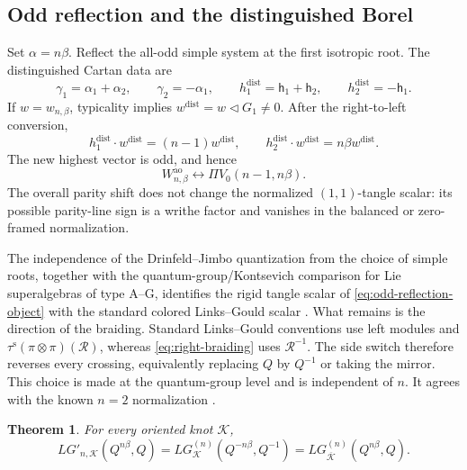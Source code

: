 \documentclass[11pt,a4paper]{article}
\newcommand{\ot}{\otimes}
\newcommand{\tri}{\mathbin{\triangleleft}}
\newcommand{\ao}{\mathrm{ao}}
\newtheorem{theorem}{Theorem}[section]
\theoremstyle{definition}
\theoremstyle{remark}
\begin{document}
\subsection{Odd reflection and the distinguished Borel}

Set \(\alpha=n\beta\).  Reflect the all-odd simple system at the first
isotropic root.  The distinguished Cartan data are
\[
\gamma_1=\alpha_1+\alpha_2,\qquad
\gamma_2=-\alpha_1,\qquad
h_1^{\mathrm{dist}}=\mathsf h_1+\mathsf h_2,\qquad
h_2^{\mathrm{dist}}=-\mathsf h_1.
\]
If \(w=w_{n,\beta}\), typicality implies
\(w^{\mathrm{dist}}=w\tri G_1\neq0\).  After the right-to-left conversion,
\[
 h_1^{\mathrm{dist}}\cdot w^{\mathrm{dist}}=(n-1)w^{\mathrm{dist}},
\qquad
 h_2^{\mathrm{dist}}\cdot w^{\mathrm{dist}}=n\beta
 w^{\mathrm{dist}}.
\]
The new highest vector is odd, and hence
\begin{equation}\label{eq:odd-reflection-object}
 W_{n,\beta}^{\ao}\longleftrightarrow
 \Pi V_0(n-1,n\beta).
\end{equation}
The overall parity shift does not change the normalized
\((1,1)\)-tangle scalar: its possible parity-line sign is a writhe factor
and vanishes in the balanced or zero-framed normalization.

The independence of the Drinfeld--Jimbo quantization from the choice of
simple roots, together with the quantum-group/Kontsevich comparison for
Lie superalgebras of type A--G, identifies the rigid tangle scalar of
\eqref{eq:odd-reflection-object} with the standard colored Links--Gould
scalar \cite{GeerCartan,GeerKontsevich}.  What remains is the direction of
the braiding.  Standard Links--Gould conventions use left modules and
\(\tau^{\mathrm s}(\pi\ot\pi)(\mathcal R)\), whereas
\eqref{eq:right-braiding} uses \(\mathcal R^{-1}\).  The side switch
therefore reverses every crossing, equivalently replacing
\(Q\) by \(Q^{-1}\) or taking the mirror.  This choice is made at the
quantum-group level and is independent of \(n\).  It agrees with the
known \(n=2\) normalization \cite[Theorem~1.5]{ColoredLG}.

\begin{theorem}\label{thm:standard-comparison}
For every oriented knot \(\mathcal K\),
\begin{equation}\label{eq:LGprime-standard}
 LG'_{n,\mathcal K}(Q^{n\beta},Q)
 =
 LG_{\mathcal K}^{(n)}(Q^{-n\beta},Q^{-1})
 =
 LG_{\overline{\mathcal K}}^{(n)}(Q^{n\beta},Q).
\end{equation}
\end{theorem}
\end{document}
